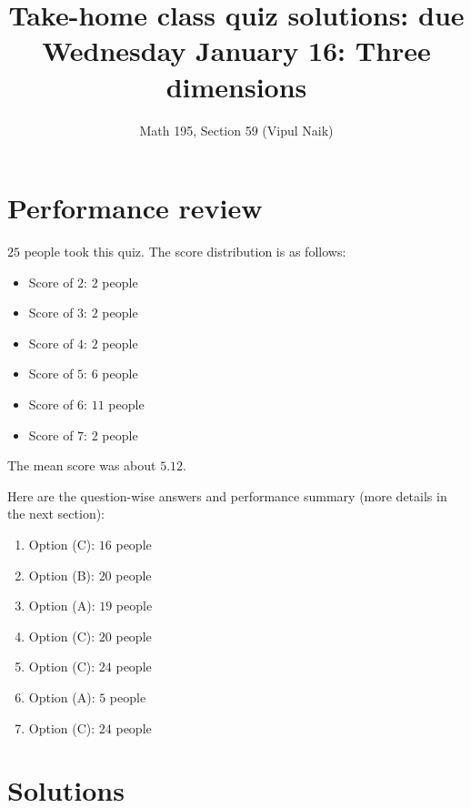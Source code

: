 \documentclass[10pt]{amsart}
\title{Take-home class quiz solutions: due Wednesday January 16: Three
dimensions}
\author{Math 195, Section 59 (Vipul Naik)}
\begin{document}
\maketitle

\section{Performance review}

$25$ people took this quiz. The score distribution is as follows:

\begin{itemize}
\item Score of $2$: $2$ people
\item Score of $3$: $2$ people
\item Score of $4$: $2$ people
\item Score of $5$: $6$ people
\item Score of $6$: $11$ people
\item Score of $7$: $2$ people
\end{itemize}

The mean score was about $5.12$.

Here are the question-wise answers and performance summary (more
details in the next section):

\begin{enumerate}
\item Option (C): $16$ people
\item Option (B): $20$ people
\item Option (A): $19$ people
\item Option (C): $20$ people
\item Option (C): $24$ people
\item Option (A): $5$ people
\item Option (C): $24$ people
\end{enumerate}

\section{Solutions}
\end{document}
